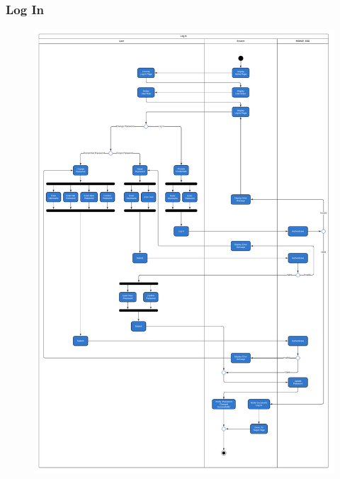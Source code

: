     \subsubsection{Log In}
    \begin{center}
    \begin{figure}[!htp]
    \begin{center}
     \includegraphics[scale=.34]{images/Task2/ActivityDiagrams/LogIn.pdf}
    \end{center}
    \label{refhinh1}
    \end{figure}
    \end{center}

